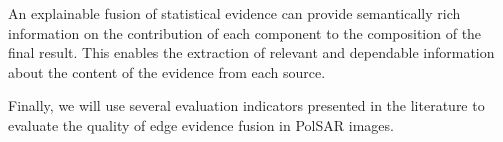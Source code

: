 \documentclass{article}
\begin{document}
An explainable fusion of statistical evidence can provide semantically rich information on the contribution of each component to the composition of the final result. 
This enables the extraction of relevant and dependable information about the content of the evidence from each source. 

Finally, we will use several evaluation indicators presented in the literature to evaluate the quality of edge evidence fusion in PolSAR images.



\newpage












\end{document}
